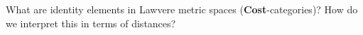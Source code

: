 
What are identity elements in Lawvere metric spaces (\textbf{Cost}-categories)? How do we interpret this in terms of distances?